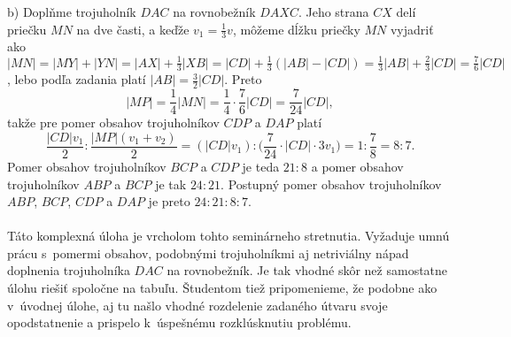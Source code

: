 {b) Doplňme trojuholník $DAC$ na rovnobežník $DAXC$. Jeho strana $CX$ delí priečku $MN$ na dve časti, a keďže $v_1 =\frac{1}{3}v$, môžeme dĺžku priečky $MN$ vyjadriť ako $|MN| = |MY | + |Y N| = |AX| +\frac{1}{3} |XB| = |CD| +\frac{1}{3} (|AB| - |CD|) = \frac{1}{3}|AB| +\frac{2}{3}|CD| = \frac{7}{6}|CD|$, lebo podľa zadania platí $|AB| =\frac{3}{2}|CD|$. Preto
$$|MP| =\frac{1}{4}|MN| =\frac{1}{4} \cdot \frac{7}{6}|CD| = \frac{7}{24}|CD|,$$
takže pre pomer obsahov trojuholníkov $CDP$ a $DAP$ platí
$$ \frac{|CD|v_1}{2}:\frac{|MP|(v_1 + v_2 )}{2}= (|CD|v_1 ) : \bigg( \frac{7}{24}\cdot |CD| \cdot 3v_1\bigg)= 1 :\frac{7}{8} = 8 : 7.$$
Pomer obsahov trojuholníkov $BCP$ a $CDP$ je teda $21 : 8$ a pomer obsahov trojuholníkov $ABP$ a $BCP$ je tak $24 : 21$. Postupný pomer obsahov trojuholníkov $ABP$, $BCP$, $CDP$ a $DAP$ je preto $24 : 21 : 8 : 7$.\\
\\
\kom Táto komplexná úloha je vrcholom tohto seminárneho stretnutia. Vyžaduje umnú prácu s~pomermi obsahov, podobnými trojuholníkmi aj netriviálny nápad doplnenia trojuholníka $DAC$ na rovnobežník. Je tak vhodné skôr než samostatne úlohu riešiť spoločne na tabuľu. Študentom tiež pripomenieme, že podobne ako v~úvodnej úlohe, aj tu našlo vhodné rozdelenie zadaného útvaru svoje opodstatnenie a prispelo k~úspešnému rozklúsknutiu problému. \\
\\
}
